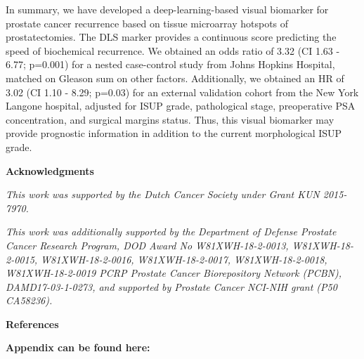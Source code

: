 \documentclass[
  12pt,
  a5,margin=2cmpaper,
]{article}
\begin{document}
In summary, we have developed a deep-learning-based visual biomarker for
prostate cancer recurrence based on tissue microarray hotspots of
prostatectomies. The DLS marker provides a continuous score predicting
the speed of biochemical recurrence. We obtained an odds ratio of 3.32
(CI 1.63 - 6.77; p=0.001) for a nested case-control study from Johns
Hopkins Hospital, matched on Gleason sum on other factors. Additionally,
we obtained an HR of 3.02 (CI 1.10 - 8.29; p=0.03) for an external
validation cohort from the New York Langone hospital, adjusted for ISUP
grade, pathological stage, preoperative PSA concentration, and surgical
margins status. Thus, this visual biomarker may provide prognostic
information in addition to the current morphological ISUP grade.

\textbf{Acknowledgments}

\emph{This work was supported by the Dutch Cancer Society under Grant
KUN 2015-7970.}

\emph{This work was additionally supported by the Department of Defense
Prostate Cancer Research Program, DOD Award No W81XWH-18-2-0013,
W81XWH-18-2-0015, W81XWH-18-2-0016, W81XWH-18-2-0017, W81XWH-18-2-0018,
W81XWH-18-2-0019 PCRP Prostate Cancer Biorepository Network (PCBN),
DAMD17-03-1-0273, and supported by Prostate Cancer NCI-NIH grant (P50
CA58236).}

\textbf{References}

\textbf{Appendix can be found here:}
\end{document}
